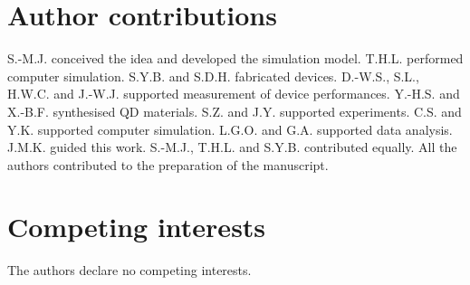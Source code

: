 \documentclass[superscriptaddress,unsortedaddress,
 amsmath,amssymb,
 aps,
]{revtex4-2}
\begin{document}
\section*{Author contributions} 
S.-M.J. conceived the idea and developed the simulation model. T.H.L. performed
computer simulation. S.Y.B. and S.D.H. fabricated devices. D.-W.S., S.L., H.W.C. and
J.-W.J. supported measurement of device performances. Y.-H.S. and X.-B.F.
synthesised QD materials. S.Z. and J.Y. supported experiments. C.S. and Y.K.
supported computer simulation. L.G.O. and G.A. supported data analysis. J.M.K.
guided this work. S.-M.J., T.H.L. and S.Y.B. contributed equally. 
All the authors
contributed to the preparation of the manuscript.

\section*{Competing interests}
The authors declare no competing interests.
\end{document}
